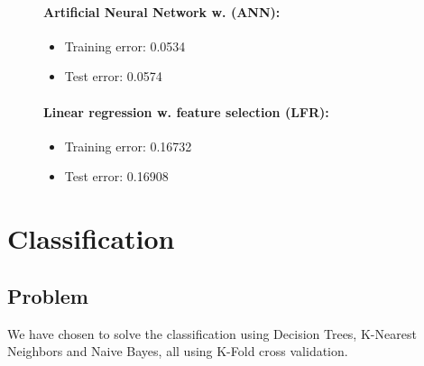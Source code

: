 \documentclass[11pt, paper=a4]{article}
\begin{document}
\begin{figure}[h]
  \begin{minipage}{0.5\textwidth}
    \paragraph{Artificial Neural Network w. (ANN):}
    \begin{itemize}
    \item Training error: 0.0534
    \item Test error:     0.0574
    \end{itemize}
  \end{minipage} \hfill
  \begin{minipage}{0.5\textwidth}
    \paragraph{Linear regression w. feature selection (LFR):}
    \begin{itemize}
    \item Training error: 0.16732
    \item Test error:     0.16908
    \end{itemize}
  \end{minipage} \vfill
  \label{fig:compare}
\end{figure}

\clearpage
\section{Classification}

\subsection{Problem}
We have chosen to solve the classification using Decision Trees,
K-Nearest Neighbors and Naive Bayes, all using K-Fold cross
validation.
\end{document}
